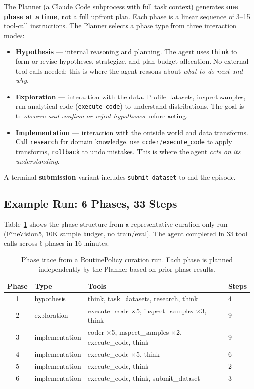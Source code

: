 The Planner (a Claude Code subprocess with full task context) generates \textbf{one phase at a time}, not a full upfront plan. Each phase is a linear sequence of 3--15 tool-call instructions. The Planner selects a phase type from three interaction modes:

\begin{itemize}
    \item \textbf{Hypothesis} --- internal reasoning and planning. The agent uses \texttt{think} to form or revise hypotheses, strategize, and plan budget allocation. No external tool calls needed; this is where the agent reasons about \emph{what to do next and why}.
    \item \textbf{Exploration} --- interaction with the data. Profile datasets, inspect samples, run analytical code (\texttt{execute\_code}) to understand distributions. The goal is to \emph{observe and confirm or reject hypotheses} before acting.
    \item \textbf{Implementation} --- interaction with the outside world and data transforms. Call \texttt{research} for domain knowledge, use \texttt{coder}/\texttt{execute\_code} to apply transforms, \texttt{rollback} to undo mistakes. This is where the agent \emph{acts on its understanding}.
\end{itemize}

\noindent A terminal \textbf{submission} variant includes \texttt{submit\_dataset} to end the episode.



\subsection{Example Run: 6 Phases, 33 Steps}

Table~\ref{tab:routine-phases} shows the phase structure from a representative curation-only run (FineVision5, 10K sample budget, no train/eval). The agent completed in 33 tool calls across 6 phases in 16 minutes.

\begin{table}[H]
\centering
\small
\caption{Phase trace from a RoutinePolicy curation run. Each phase is planned independently by the Planner based on prior phase results.}
\label{tab:routine-phases}
\begin{tabular}{clp{4cm}l}
\toprule
\textbf{Phase} & \textbf{Type} & \textbf{Tools} & \textbf{Steps} \\
\midrule
1 & hypothesis & think, task\_datasets, research, think & 4 \\
2 & exploration & execute\_code $\times$5, inspect\_samples $\times$3, think & 9 \\
3 & implementation & coder $\times$5, inspect\_samples $\times$2, execute\_code, think & 9 \\
4 & implementation & execute\_code $\times$5, think & 6 \\
5 & implementation & execute\_code, think & 2 \\
6 & implementation & execute\_code, think, submit\_dataset & 3 \\
\bottomrule
\end{tabular}
\end{table}

